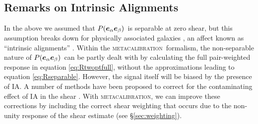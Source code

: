 \documentclass[iop]{emulateapj}
\newcommand{\vest}{\mbox{\boldmath $e$}}
\newcommand{\mcal}{\textsc{metacalibration}}
\newcommand{\probe}{\mbox{$P(\vest_\alpha \vest_\beta)$}}
\begin{document}
\subsection{Remarks on Intrinsic Alignments} \label{sec:IA}

In the above we assumed that \probe\ is separable at zero shear, but this
assumption breaks down for physically associated galaxies
\citep[e.g.][]{HirataIntrinsicAlign07}, an affect known as ``intrinsic
alignments'' \citep[IA; for a recent review, see][]{TroxelIAReview2015}.
Within the \mcal\ formalism, the non-separable nature of \probe\ can be partly
dealt with by calculating the full pair-weighted response in equation
\ref{eq:Rtwoptfull}, without the approximations leading to equation
\ref{eq:Rseparable}.  However, the signal itself will be biased by the presence
of IA.  A number of methods  have been proposed to correct for the
contaminating effect of IA in the shear \citep{TroxelIAReview2015}.  With
\mcal, we can improve these corrections by including the correct shear
weighting that occurs due to the non-unity response of the shear estimate (see
\S \ref{sec:weighting}).
\end{document}
